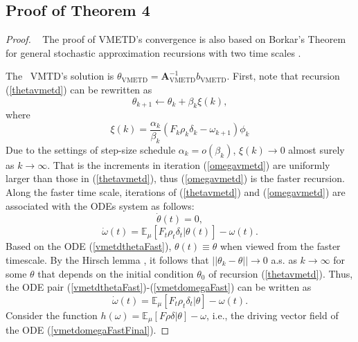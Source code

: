 \subsection{Proof of Theorem 4}
\label{proofVMETD}
\begin{proof}
\label{th4proof}   
The proof of VMETD's convergence is also based on Borkar's Theorem   for
general stochastic approximation recursions with two time scales
\cite{borkar1997stochastic}. 

The  VMTD's solution is
${\theta}_{\text{VMETD}}=\textbf{A}_{\text{VMETD}}^{-1}{b}_{\text{VMETD}}$.
First, note that recursion (\ref{thetavmetd}) can be rewritten as
\begin{equation*}
 {\theta}_{k+1}\leftarrow {\theta}_k+\beta_k{\xi}(k),
\end{equation*}
 where
\begin{equation*}
 {\xi}(k)=\frac{\alpha_k}{\beta_k} (F_k \rho_k\delta_k - \omega_{k+1}){\phi}_k
\end{equation*}
 Due to the settings of step-size schedule $\alpha_k = o(\beta_k)$,
${\xi}(k)\rightarrow 0$ almost surely as $k\rightarrow\infty$. 
 That is the increments in iteration (\ref{omegavmetd}) are uniformly larger than
 those in (\ref{thetavmetd}), thus (\ref{omegavmetd}) is the faster recursion.
 Along the faster time scale, iterations of (\ref{thetavmetd}) and (\ref{omegavmetd})
 are associated with the ODEs system as follows:
\begin{equation}
 \dot{{\theta}}(t) = 0,
\label{vmetdthetaFast}
\end{equation}
\begin{equation}
 \dot{\omega}(t)=\mathbb{E}_{\mu}[F_t\rho_t\delta_t|{\theta}(t)]-\omega(t).
\label{vmetdomegaFast}
\end{equation}
 Based on the ODE (\ref{vmetdthetaFast}), ${\theta}(t)\equiv {\theta}$ when
 viewed from the faster timescale. 
 By the Hirsch lemma \cite{hirsch1989convergent}, it follows that
$||{\theta}_k-{\theta}||\rightarrow 0$ a.s. as $k\rightarrow \infty$ for some
${\theta}$ that depends on the initial condition ${\theta}_0$ of recursion
(\ref{thetavmetd}).
 Thus, the ODE pair (\ref{vmetdthetaFast})-(\ref{vmetdomegaFast}) can be written as
\begin{equation}
 \dot{\omega}(t)=\mathbb{E}_{\mu}[F_t\rho_t\delta_t|{\theta}]-\omega(t).
\label{vmetdomegaFastFinal}
\end{equation}
 Consider the function $h(\omega)=\mathbb{E}_{\mu}[F\rho\delta|{\theta}]-\omega$,
 i.e., the driving vector field of the ODE (\ref{vmetdomegaFastFinal}).

\end{proof}
